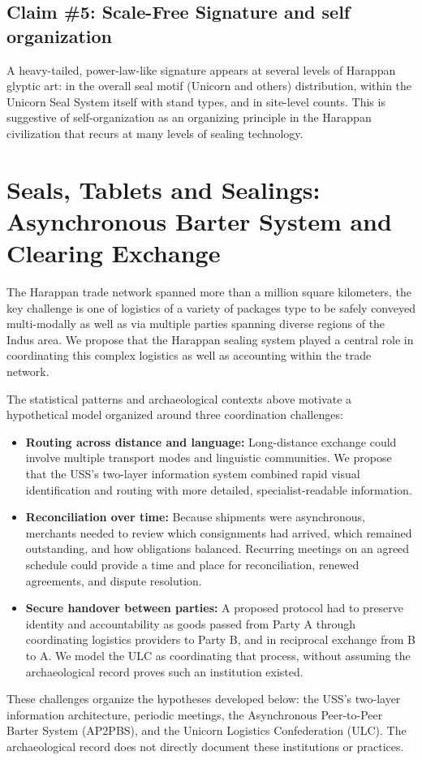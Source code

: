 \documentclass[12pt]{article}
\begin{document}
\subsection{Claim \#5: Scale-Free Signature and self organization}

A heavy-tailed, power-law-like signature appears at several levels of Harappan
glyptic art: in the overall seal motif (Unicorn and others) distribution, within
the Unicorn Seal System itself with stand types, and in site-level counts. This is
suggestive of self-organization as an organizing principle in the Harappan
civilization that recurs at many levels of sealing technology.


\section{Seals, Tablets and Sealings: Asynchronous Barter System and Clearing Exchange}

The Harappan trade network spanned more than a million square kilometers, the key
challenge is one of logistics of a variety of packages type to be safely conveyed
multi-modally as well as via multiple parties spanning diverse regions of the Indus
area. We propose that the Harappan sealing system played a central role in
coordinating this complex logistics as well as accounting within the trade network.

The statistical patterns and archaeological contexts above motivate a
hypothetical model organized around three coordination challenges:
\begin{itemize}
    \item \textbf{Routing across distance and language:} Long-distance exchange
    could involve multiple transport modes and linguistic communities. We propose
    that the USS's two-layer information system combined rapid visual
    identification and routing with more detailed, specialist-readable information.
    \item \textbf{Reconciliation over time:} Because shipments were asynchronous,
    merchants needed to review which consignments had arrived, which remained
    outstanding, and how obligations balanced. Recurring meetings on an agreed
    schedule could provide a time and place for reconciliation, renewed agreements,
    and dispute resolution.
    \item \textbf{Secure handover between parties:} A proposed protocol had to
    preserve identity and accountability as goods passed from Party A through
    coordinating logistics providers to Party B, and in reciprocal exchange from
    B to A. We model the ULC as coordinating that process, without assuming the
    archaeological record proves such an institution existed.
\end{itemize}
These challenges organize the hypotheses developed below: the USS's two-layer
information architecture, periodic meetings, the Asynchronous Peer-to-Peer Barter
System (AP2PBS), and the Unicorn Logistics Confederation (ULC). The archaeological
record does not directly document these institutions or practices.
\end{document}
